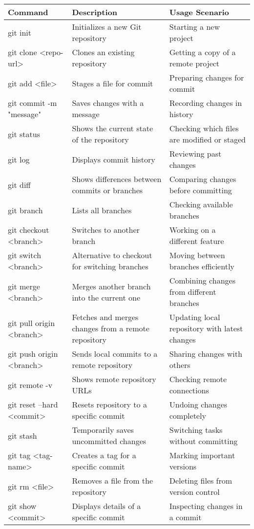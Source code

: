 \begin{longtable}{|l|p{6cm}|p{6cm}|}
    \hline
    \textbf{Command} & \textbf{Description} & \textbf{Usage Scenario} \\
    \hline
    \endhead
    git init & Initializes a new Git repository & Starting a new project \\
    \hline
    git clone \textless repo-url\textgreater & Clones an existing repository & Getting a copy of a remote project \\
    \hline
    git add \textless file\textgreater & Stages a file for commit & Preparing changes for commit \\
    \hline
    git commit -m "message" & Saves changes with a message & Recording changes in history \\
    \hline
    git status & Shows the current state of the repository & Checking which files are modified or staged \\
    \hline
    git log & Displays commit history & Reviewing past changes \\
    \hline
    git diff & Shows differences between commits or branches & Comparing changes before committing \\
    \hline
    git branch & Lists all branches & Checking available branches \\
    \hline
    git checkout \textless branch\textgreater & Switches to another branch & Working on a different feature \\
    \hline
    git switch \textless branch\textgreater & Alternative to checkout for switching branches & Moving between branches efficiently \\
    \hline
    git merge \textless branch\textgreater & Merges another branch into the current one & Combining changes from different branches \\
    \hline
    git pull origin \textless branch\textgreater & Fetches and merges changes from a remote repository & Updating local repository with latest changes \\
    \hline
    git push origin \textless branch\textgreater & Sends local commits to a remote repository & Sharing changes with others \\
    \hline
    git remote -v & Shows remote repository URLs & Checking remote connections \\
    \hline
    git reset --hard \textless commit\textgreater & Resets repository to a specific commit & Undoing changes completely \\
    \hline
    git stash & Temporarily saves uncommitted changes & Switching tasks without committing \\
    \hline
    git tag \textless tag-name\textgreater & Creates a tag for a specific commit & Marking important versions \\
    \hline
    git rm \textless file\textgreater & Removes a file from the repository & Deleting files from version control \\
    \hline
    git show \textless commit\textgreater & Displays details of a specific commit & Inspecting changes in a commit \\
    \hline
\end{longtable}

